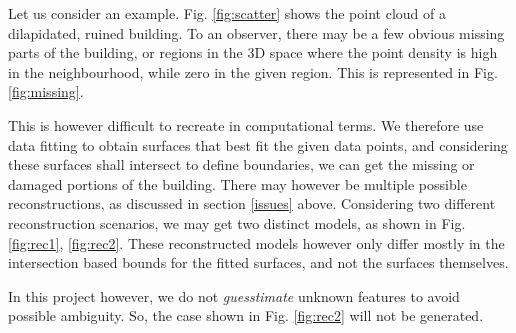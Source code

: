 \documentclass[12pt,a4paper]{article}
\begin{document}
    Let us consider an example. Fig. \ref{fig:scatter} shows the point cloud of a dilapidated, ruined building. To an observer, there may be a few obvious missing parts of the building, or regions in the 3D space where the point density is high in the neighbourhood, while zero in the given region. This is represented in Fig. \ref{fig:missing}.
    
    This is however difficult to recreate in computational terms. We therefore use data fitting to obtain surfaces that best fit the given data points, and considering these surfaces shall intersect to define boundaries, we can get the missing or damaged portions of the building. There may however be multiple possible reconstructions, as discussed in section \ref{issues} above. Considering two different reconstruction scenarios, we may get two distinct models, as shown in Fig. \ref{fig:rec1}, \ref{fig:rec2}. These reconstructed models however only differ mostly in the intersection based bounds for the fitted surfaces, and not the surfaces themselves.
    
    In this project however, we do not \textit{guesstimate} unknown features to avoid possible ambiguity. So, the case shown in Fig. \ref{fig:rec2} will not be generated.
    
    
    
\end{document}
